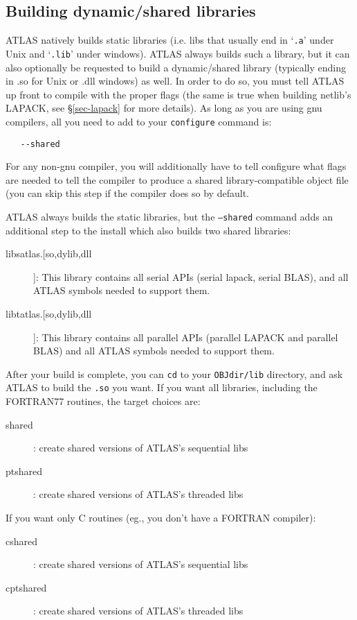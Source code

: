 \documentclass[11pt]{article}
\begin{document}
\subsection{Building dynamic/shared libraries}
\label{sec-shared}
ATLAS natively builds static libraries (i.e. libs that usually end in
`\texttt{.a}' under Unix and `\texttt{.lib}' under windows).  
ATLAS always builds such a library,
but it can also optionally be requested to build a dynamic/shared library
(typically ending in .so for Unix or .dll windows) as well.  In order to do so,
you must tell ATLAS up front to compile with the proper flags (the same is
true when building netlib's LAPACK, see \S\ref{sec-lapack} for more details).  
As long as you are using gnu compilers, all you need to add to your 
{\tt configure} command is:
\vspace*{-0.1in}
\begin{verbatim}
   --shared
\end{verbatim}

For any non-gnu compiler, you will additionally have to tell configure what
flags are
needed to tell the compiler to produce a shared library-compatible object
file (you can skip this step if the compiler does so by default.

ATLAS always builds the static libraries, but the {\tt --shared} command
adds an additional step to the install which also builds two shared libraries:
\begin{description}
\item [libsatlas.[so,dylib,dll]]: This library contains all serial APIs
      (serial lapack, serial BLAS), 
      and all ATLAS symbols needed to support them.
\item [libtatlas.[so,dylib,dll]]: This library contains all parallel
      APIs (parallel LAPACK and parallel BLAS) 
      and all ATLAS symbols needed to support them.
\end{description}

After your build is complete, you can {\tt cd} to your {\tt OBJdir/lib} 
directory, and
ask ATLAS to build the {\tt .so} you want.  If you want all libraries, including
the FORTRAN77 routines, the target choices are:
\begin{description}
\item [shared] : create shared versions of ATLAS's sequential libs
\item [ptshared] : create shared versions of ATLAS's threaded libs
\end{description}
If you want only C routines (eg., you don't have a FORTRAN compiler):
\begin{description}
\item [cshared] : create shared versions of ATLAS's sequential libs
\item [cptshared] : create shared versions of ATLAS's threaded libs
\end{description}
\end{document}
